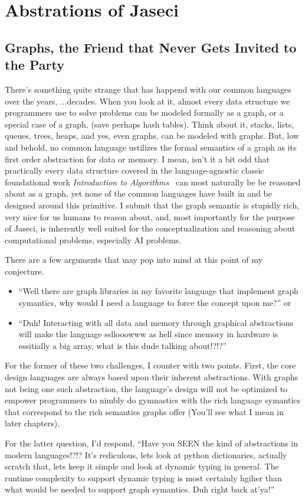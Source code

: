 \chapter{Abstrations of Jaseci}
\section{Graphs, the Friend that Never Gets Invited to the Party}
There's something quite strange that has happend with our \gls{common languages} over the years, ...decades. When you look at it, almost every data structure we programmers use to solve problems can be modeled formally as a graph, or a special case of a graph, (save perhaps hash tables). Think about it, stacks, lists, queues, trees, heaps, and yes, even graphs, can be modeled with graphs. But, low and behold, no common language ustilizes the formal semantics of a graph as its first order abstraction for data or memory. I mean, isn't it a bit odd that practically every data structure covered in the language-agnostic classic foundational work \textit{Introduction to Algorithms}~\cite{intro_to_algo} can most naturally be be reasoned about as a graph, yet none of the common languages have built in and be designed around this primitive. I submit that the graph semantic is stupidly rich, very nice for us humans to reason about, and, most importantly for the purpose of Jaseci, is inherently well suited for the conceptualization and reasoning about computational problems, especially AI problems.
\par
There are a few arguments that may pop into mind at this point of my conjecture.
\begin{itemize}
    \item ``Well there are graph libraries in my favorite language that implement graph symantics, why would I need a language to force the concept upon me?''
          or
    \item ``Duh! Interacting with all data and memory through graphical abstractions will make the language ssllooowww as hell since memory in hardware is essitially a big array, what is this dude talking about!?!?''
\end{itemize}
\par
For the former of these two challenges, I counter with two points. First, the core design languages are always based upon their inherent abstractions. With graphs not being one such abstraction, the language's design will not be optimized to empower programmers to nimbly do gymnastics with the rich language symantics that correspond to the rich semantics graphs offer (You'll see what I mean in later chapters).
\par
For the latter question, I'd respond, ``Have you SEEN the kind of abstractions in modern languages!?!? It's rediculous, lets look at python dictionaries, actually scratch that, lets keep it simple and look at dynamic typing in general. The runtime complexity to support dynamic typing is most certainly hgiher than what would be needed to support graph symantics. Duh right back at'ya!''
